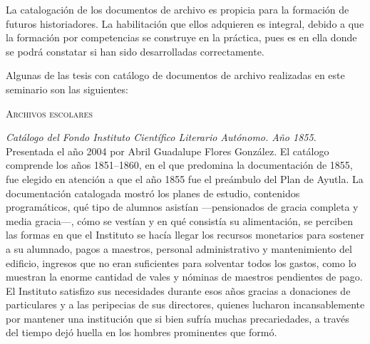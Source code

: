 La catalogación de los documentos de archivo es propicia para la 
formación de futuros historiadores. La habilitación que ellos adquieren 
es integral, debido a que la formación por competencias se construye en 
la práctica,  pues es en ella donde se podrá constatar si han sido desarrolladas 
correctamente.

Algunas de las tesis con catálogo de documentos de archivo realizadas 
en este seminario son las siguientes:

\smallskip
\noindent \textsc{Archivos escolares}

\smallskip 
\noindent \textsl{Catálogo del Fondo Instituto Científico  
Literario Autónomo. Año 1855}. Presentada el año 2004 por Abril 
Guadalupe Flores González. El catálogo comprende los años 1851--1860, en 
el que predomina la documentación de 1855, fue elegido en atención a 
que el año 1855 fue el preámbulo del Plan de Ayutla. La documentación 
catalogada mostró los planes de estudio, contenidos programáticos, qué 
tipo de alumnos asistían ---pensionados de gracia completa y media 
gracia---, cómo se vestían y en qué consistía su alimentación, se perciben 
las formas en que el Instituto se hacía llegar los recursos monetarios 
para sostener a su alumnado, pagos a maestros, personal administrativo 
y mantenimiento del edificio, ingresos que no eran suficientes para 
solventar todos los gastos, como lo muestran la enorme cantidad de 
vales y nóminas de maestros pendientes de pago. El Instituto satisfizo 
sus necesidades durante esos años gracias a donaciones de particulares 
y a las peripecias de sus directores, quienes lucharon incansablemente 
por mantener una institución que si bien sufría muchas precariedades, a 
través del tiempo dejó huella en los hombres prominentes que formó.
\enlargethispage{\baselineskip}

